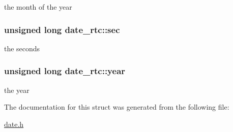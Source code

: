 the month of the year 

\subsubsection[{\texorpdfstring{sec}{sec}}]{\setlength{\rightskip}{0pt plus 5cm}unsigned long date\+\_\+rtc\+::sec}\hypertarget{structdate__rtc_a4d0f917003e201fbfe662d4c91907645}{}\label{structdate__rtc_a4d0f917003e201fbfe662d4c91907645}


the seconds 

\subsubsection[{\texorpdfstring{year}{year}}]{\setlength{\rightskip}{0pt plus 5cm}unsigned long date\+\_\+rtc\+::year}\hypertarget{structdate__rtc_abf8b053026cf0db4cc2d260ce9cce925}{}\label{structdate__rtc_abf8b053026cf0db4cc2d260ce9cce925}


the year 



The documentation for this struct was generated from the following file\+:\begin{DoxyCompactItemize}
\item 
\hyperlink{date_8h}{date.\+h}\end{DoxyCompactItemize}
